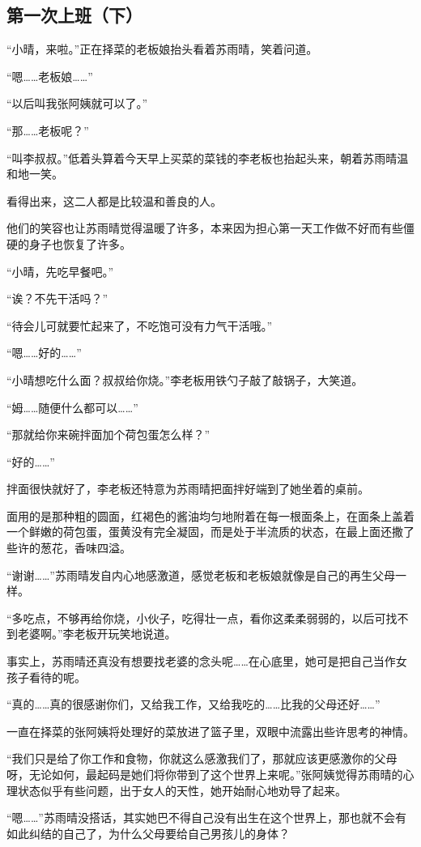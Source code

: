 \subsection{第一次上班（下）}

“小晴，来啦。”正在择菜的老板娘抬头看着苏雨晴，笑着问道。

“嗯……老板娘……”

“以后叫我张阿姨就可以了。”

“那……老板呢？”

“叫李叔叔。”低着头算着今天早上买菜的菜钱的李老板也抬起头来，朝着苏雨晴温和地一笑。

看得出来，这二人都是比较温和善良的人。

他们的笑容也让苏雨晴觉得温暖了许多，本来因为担心第一天工作做不好而有些僵硬的身子也恢复了许多。

“小晴，先吃早餐吧。”

“诶？不先干活吗？”

“待会儿可就要忙起来了，不吃饱可没有力气干活哦。”

“嗯……好的……”

“小晴想吃什么面？叔叔给你烧。”李老板用铁勺子敲了敲锅子，大笑道。

“姆……随便什么都可以……”

“那就给你来碗拌面加个荷包蛋怎么样？”

“好的……”

拌面很快就好了，李老板还特意为苏雨晴把面拌好端到了她坐着的桌前。

面用的是那种粗的圆面，红褐色的酱油均匀地附着在每一根面条上，在面条上盖着一个鲜嫩的荷包蛋，蛋黄没有完全凝固，而是处于半流质的状态，在最上面还撒了些许的葱花，香味四溢。

“谢谢……”苏雨晴发自内心地感激道，感觉老板和老板娘就像是自己的再生父母一样。

“多吃点，不够再给你烧，小伙子，吃得壮一点，看你这柔柔弱弱的，以后可找不到老婆啊。”李老板开玩笑地说道。

事实上，苏雨晴还真没有想要找老婆的念头呢……在心底里，她可是把自己当作女孩子看待的呢。

“真的……真的很感谢你们，又给我工作，又给我吃的……比我的父母还好……”

一直在择菜的张阿姨将处理好的菜放进了篮子里，双眼中流露出些许思考的神情。

“我们只是给了你工作和食物，你就这么感激我们了，那就应该更感激你的父母呀，无论如何，最起码是她们将你带到了这个世界上来呢。”张阿姨觉得苏雨晴的心理状态似乎有些问题，出于女人的天性，她开始耐心地劝导了起来。

“嗯……”苏雨晴没搭话，其实她巴不得自己没有出生在这个世界上，那也就不会有如此纠结的自己了，为什么父母要给自己男孩儿的身体？

